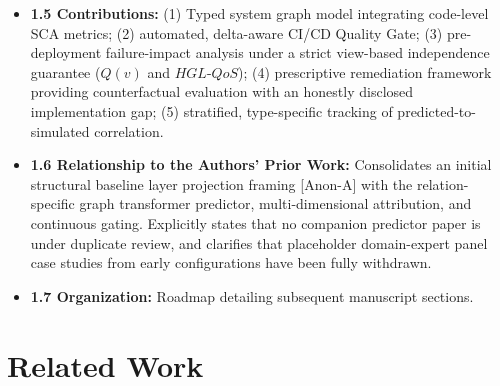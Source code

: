 \documentclass[review]{elsarticle}
\begin{document}
\begin{itemize}[leftmargin=*]
  \item \textbf{1.5 Contributions:} (1) Typed system graph model integrating code-level SCA metrics; (2) automated, delta-aware CI/CD Quality Gate; (3) pre-deployment failure-impact analysis under a strict view-based independence guarantee ($Q(v)$ and $HGL\text{-}QoS$); (4) prescriptive remediation framework providing counterfactual evaluation with an honestly disclosed implementation gap; (5) stratified, type-specific tracking of predicted-to-simulated correlation.
  \item \textbf{1.6 Relationship to the Authors' Prior Work:} Consolidates an initial structural baseline layer projection framing [Anon-A] with the relation-specific graph transformer predictor, multi-dimensional attribution, and continuous gating. Explicitly states that no companion predictor paper is under duplicate review, and clarifies that placeholder domain-expert panel case studies from early configurations have been fully withdrawn.
  \item \textbf{1.7 Organization:} Roadmap detailing subsequent manuscript sections.
\end{itemize}

\section{Related Work}
\end{document}
